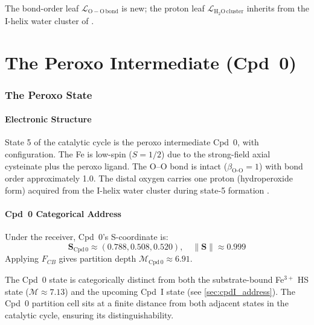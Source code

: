 \documentclass[11pt,twocolumn,a4paper]{article}
\theoremstyle{definition}
\theoremstyle{remark}
\newcommand{\Scoord}{\mathbf{S}}
\newcommand{\Leaf}{\mathcal{L}}
\newcommand{\depth}{\mathcal{M}}
\newcommand{\bondorder}{\beta_{\mathrm{O\text{-}O}}}
\newcommand{\CmpdZero}{\mathrm{Cpd\,0}}
\begin{document}
The bond-order leaf $\Leaf_{\mathrm{O-O\,bond}}$ is new; the proton leaf
$\Leaf_{\mathrm{H_2O\,cluster}}$ inherits from the I-helix water cluster of
\citep{sachikonye2025_paper3}.

\part{The Peroxo Intermediate (Cpd~0)}

\section{The Peroxo State}
\label{sec:peroxo_state}

\subsection{Electronic Structure}

State 5 of the catalytic cycle is the peroxo intermediate Cpd~0, with
 configuration. The Fe is low-spin ($S = 1/2$) due to the
strong-field axial cysteinate plus the peroxo ligand. The O--O bond is
intact ($\bondorder = 1$) with bond order approximately 1.0. The distal
oxygen carries one proton (hydroperoxide form) acquired from the I-helix
water cluster during state-5 formation \citep{denisov2005}.

\subsection{Cpd~0 Categorical Address}
\label{sec:cpd0_partition}

Under the receiver, Cpd~0's S-coordinate is:
\begin{equation}
\Scoord_{\CmpdZero} \approx (0.788, 0.508, 0.520),\quad \|\Scoord\| \approx 0.999
\end{equation}
Applying $F_{CB}$ gives partition depth
$\depth_{\CmpdZero} \approx 6.91$.

The Cpd~0 state is categorically distinct from both the substrate-bound
Fe$^{3+}$ HS state ($\depth \approx 7.13$) and the upcoming Cpd~I state
(see \cref{sec:cpdI_address}). The Cpd~0 partition cell sits at a finite
distance from both adjacent states in the catalytic cycle, ensuring its
distinguishability.
\end{document}
